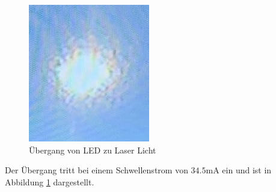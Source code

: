 \begin{figure}[h]
\begin{minipage}[t]{0.45\textwidth}
        \includegraphics[width=1\linewidth]{abb/Lasergranulation.jpeg}
    \end{minipage}
    \caption{Übergang von LED zu Laser Licht}
    \label{fig:Strom}
\end{figure}
Der Übergang tritt bei einem Schwellenstrom von $34.5$mA ein und ist in Abbildung \ref{fig:Strom} dargestellt.

